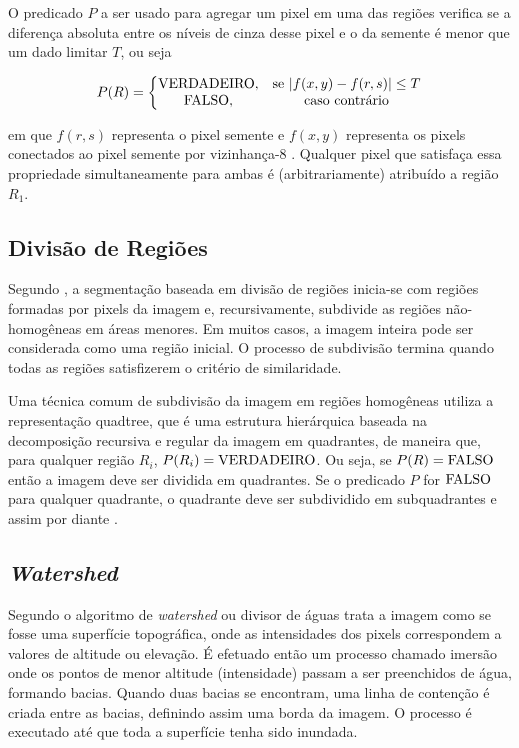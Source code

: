 \documentclass[12pt,oneside,a4paper,english,french,spanish,brazil,]{abntex2}
\begin{document}
O predicado \(P\) a ser usado para agregar um pixel em uma das regiões verifica se a diferença absoluta entre os níveis de cinza desse pixel e o da semente é menor que um dado limitar \(T\), ou seja

\[P(R) = \left\{\begin{matrix}
\textup{VERDADEIRO}, & \textup{se }|f(x,y) - f(r,s)| \leq T\\ 
\textup{FALSO}, & \textup{caso contrário}
\end{matrix}\right.\]

em que \(f(r,s)\) representa o pixel semente e \(f(x,y)\) representa os pixels conectados ao pixel semente por vizinhança-8 \cite{pedrini:2008}. Qualquer pixel que satisfaça essa propriedade simultaneamente para ambas é (arbitrariamente) atribuído a região \(R_1\). 

\subsection{Divisão de Regiões}

Segundo \citet{pedrini:2008}, a segmentação baseada em divisão de regiões inicia-se com regiões formadas por pixels da imagem e, recursivamente, subdivide as regiões não-homogêneas em áreas menores. Em muitos casos, a imagem inteira pode ser considerada como uma região inicial. O processo de subdivisão termina quando todas as regiões satisfizerem o critério de similaridade.

Uma técnica comum de subdivisão da imagem em regiões homogêneas utiliza a representação quadtree, que é uma estrutura hierárquica baseada na decomposição recursiva e regular da imagem em quadrantes, de maneira que, para qualquer região \(R_i\), \(P(R_i) = \textup{VERDADEIRO}\). Ou seja, se \(P(R) = \textup{FALSO}\) então a imagem deve ser dividida em quadrantes. Se o predicado \(P\) for \(\textup{FALSO}\) para qualquer quadrante, o quadrante deve ser subdividido em subquadrantes e assim por diante \cite{pedrini:2008}.

\subsection{\textit{Watershed}}

Segundo \citet{pedrini:2008} o algoritmo de \textit{watershed} ou divisor de águas trata a imagem como se fosse uma superfície topográfica, onde as intensidades dos pixels correspondem a valores de altitude ou elevação. É efetuado então um processo chamado imersão onde os pontos de menor altitude (intensidade) passam a ser preenchidos de água, formando bacias. Quando duas bacias se encontram, uma linha de contenção é criada entre as bacias, definindo assim uma borda da imagem. O processo é executado até que toda a superfície tenha sido inundada.
\end{document}
